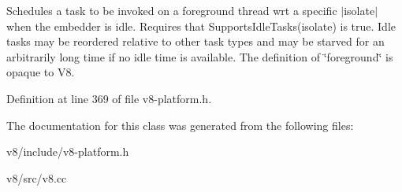 Schedules a task to be invoked on a foreground thread wrt a specific $\vert$isolate$\vert$ when the embedder is idle. Requires that Supports\+Idle\+Tasks(isolate) is true. Idle tasks may be reordered relative to other task types and may be starved for an arbitrarily long time if no idle time is available. The definition of \char`\"{}foreground\char`\"{} is opaque to V8. 

Definition at line 369 of file v8-\/platform.\+h.



The documentation for this class was generated from the following files\+:\begin{DoxyCompactItemize}
\item 
v8/include/v8-\/platform.\+h\item 
v8/src/v8.\+cc\end{DoxyCompactItemize}
